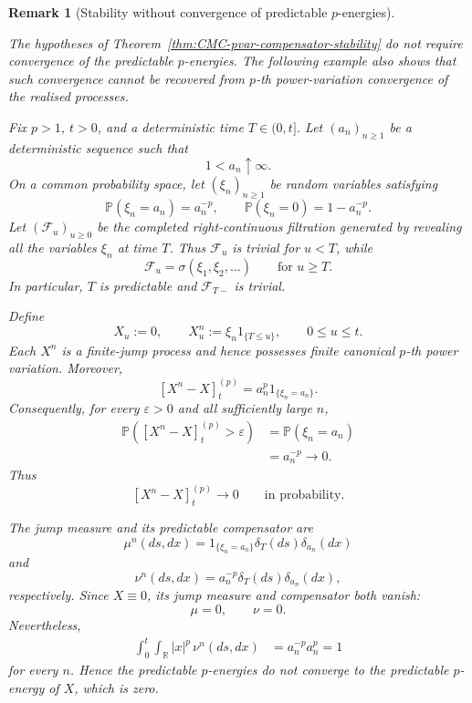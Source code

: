 \documentclass[a4paper,10pt]{article}
\newtheorem{rema}[thm]{Remark}
\renewcommand{\P}{\mathbb P}
\begin{document}
\begin{rema}[Stability without convergence of predictable \(p\)-energies]
\label{rema:separating-example-p-energy}

The hypotheses of
Theorem~\ref{thm:CMC-pvar-compensator-stability} do not require
convergence of the predictable \(p\)-energies. The following example
also shows that such convergence cannot be recovered from
\(p\)-th power-variation convergence of the realised processes.

Fix \(p>1\), \(t>0\), and a deterministic time \(T\in(0,t]\). Let
\((a_n)_{n\ge1}\) be a deterministic sequence such that
\[
        1<a_n\uparrow\infty.
\]
On a common probability space, let \((\xi_n)_{n\ge1}\) be random
variables satisfying
\[
        \P(\xi_n=a_n)=a_n^{-p},
        \qquad
        \P(\xi_n=0)=1-a_n^{-p}.
\]
Let \((\mathcal F_u)_{u\ge0}\) be the completed right-continuous
filtration generated by revealing all the variables \(\xi_n\) at time
\(T\). Thus \(\mathcal F_u\) is trivial for \(u<T\), while
\[
        \mathcal F_u
        =
        \sigma(\xi_1,\xi_2,\ldots)
        \qquad\text{for }u\ge T.
\]
In particular, \(T\) is predictable and \(\mathcal F_{T-}\) is
trivial.

Define
\[
        X_u:=0,
        \qquad
        X_u^n:=\xi_n1_{\{T\le u\}},
        \qquad 0\le u\le t.
\]
Each \(X^n\) is a finite-jump process and hence possesses finite
canonical \(p\)-th power variation. Moreover,
\[
        [X^n-X]^{(p)}_t
        =
        a_n^p1_{\{\xi_n=a_n\}}.
\]
Consequently, for every \(\varepsilon>0\) and all sufficiently large
\(n\),
\[
\begin{aligned}
\P\left([X^n-X]^{(p)}_t>\varepsilon\right)
&=
\P(\xi_n=a_n)\\
&=
a_n^{-p}
\longrightarrow0.
\end{aligned}
\]
Thus
\[
        [X^n-X]^{(p)}_t
        \longrightarrow0
        \qquad\text{in probability}.
\]

The jump measure and its predictable compensator are
\[
        \mu^n(ds,dx)
        =
        1_{\{\xi_n=a_n\}}
        \delta_T(ds)\delta_{a_n}(dx)
\]
and
\[
        \nu^n(ds,dx)
        =
        a_n^{-p}\delta_T(ds)\delta_{a_n}(dx),
\]
respectively. Since \(X\equiv0\), its jump measure and compensator
both vanish:
\[
        \mu=0,
        \qquad
        \nu=0.
\]
Nevertheless,
\[
\begin{aligned}
\int_0^t\int_{\mathbb R}|x|^p\,\nu^n(ds,dx)
&=
a_n^{-p}a_n^p=
1
\end{aligned}
\]
for every \(n\). Hence the predictable \(p\)-energies do not converge
to the predictable \(p\)-energy of \(X\), which is zero.


\end{rema}
\end{document}
